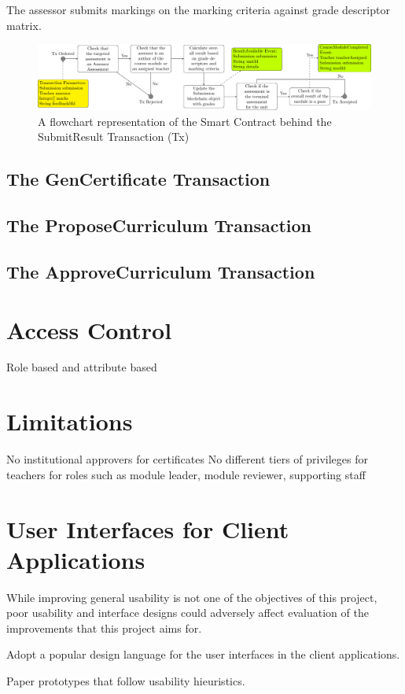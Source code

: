 The assessor submits markings on the marking criteria against grade descriptor matrix.

\begin{figure}[!ht]
    \centering
    \includegraphics[width=1.0\textwidth]{srtx}    
    \caption{A flowchart representation of the Smart Contract behind the SubmitResult Transaction (Tx)} \label{fig:srtx}
\end{figure}

\subsection{The GenCertificate Transaction}

\subsection{The ProposeCurriculum Transaction}

\subsection{The ApproveCurriculum Transaction}


\section{Access Control}
Role based and attribute based

\section{Limitations}
No institutional approvers for certificates
No different tiers of privileges for teachers for roles such as module leader, module reviewer, supporting staff

\section{User Interfaces for Client Applications}

While improving general usability is not one of the objectives of this project, poor usability and interface designs 
could adversely affect evaluation of the improvements that this project aims for.

Adopt a popular design language for the user interfaces in the client applications.

Paper prototypes that follow usability hieuristics.